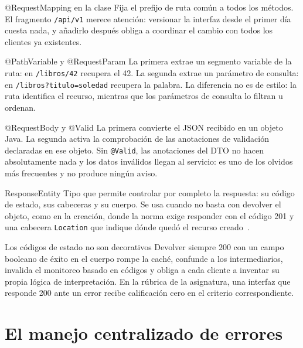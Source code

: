 \documentclass[11pt,a4paper,openany]{book}
\begin{document}
\begin{cajadefinicion}{@RequestMapping en la clase}
	Fija el prefijo de ruta común a todos los métodos. El fragmento \texttt{/api/v1} merece atención: versionar la interfaz desde el primer día cuesta nada, y añadirlo después obliga a coordinar el cambio con todos los clientes ya existentes.
\end{cajadefinicion}

\begin{cajadefinicion}{@PathVariable y @RequestParam}
	La primera extrae un segmento variable de la ruta: en \texttt{/libros/42} recupera el 42. La segunda extrae un parámetro de consulta: en \texttt{/libros?titulo=soledad} recupera la palabra. La diferencia no es de estilo: la ruta identifica el recurso, mientras que los parámetros de consulta lo filtran u ordenan.
\end{cajadefinicion}

\begin{cajadefinicion}{@RequestBody y @Valid}
	La primera convierte el JSON recibido en un objeto Java. La segunda activa la comprobación de las anotaciones de validación declaradas en ese objeto. Sin \texttt{@Valid}, las anotaciones del DTO no hacen absolutamente nada y los datos inválidos llegan al servicio: es uno de los olvidos más frecuentes y no produce ningún aviso.
\end{cajadefinicion}

\begin{cajadefinicion}{ResponseEntity}
	Tipo que permite controlar por completo la respuesta: su código de estado, sus cabeceras y su cuerpo. Se usa cuando no basta con devolver el objeto, como en la creación, donde la norma exige responder con el código 201 y una cabecera \texttt{Location} que indique dónde quedó el recurso creado~\cite{rfc9110}.
\end{cajadefinicion}

\begin{cajaadvertencia}{Los códigos de estado no son decorativos}
	Devolver siempre 200 con un campo booleano de éxito en el cuerpo rompe la caché, confunde a los intermediarios, invalida el monitoreo basado en códigos y obliga a cada cliente a inventar su propia lógica de interpretación. En la rúbrica de la asignatura, una interfaz que responde 200 ante un error recibe calificación cero en el criterio correspondiente.
\end{cajaadvertencia}

\section{El manejo centralizado de errores}
\label{sec:manejo-errores}
\end{document}
